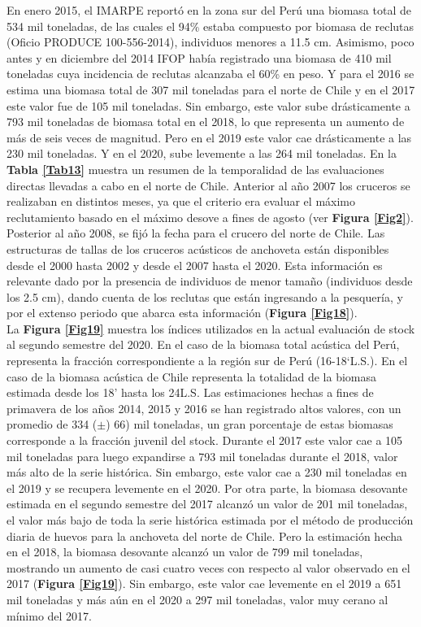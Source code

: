 \documentclass[letter,11pt]{article}
\begin{document}
En enero 2015, el IMARPE report\'o en la zona sur del Per\'u una biomasa
total de 534 mil toneladas, de las cuales el 94\% estaba compuesto por
biomasa de reclutas (Oficio PRODUCE 100-556-2014), individuos menores a
11.5 cm. Asimismo, poco antes y en diciembre del 2014 IFOP hab\'ia
registrado una biomasa de 410 mil toneladas cuya incidencia de reclutas
alcanzaba el 60\% en peso. Y para el 2016 se estima una biomasa total de
307 mil toneladas para el norte de Chile y en el 2017 este valor fue de
105 mil toneladas. Sin embargo, este valor sube dr\'asticamente a 793 mil
toneladas de biomasa total en el 2018, lo que representa un aumento de
m\'as de seis veces de magnitud. Pero en el 2019 este valor cae
dr\'asticamente a las 230 mil toneladas. Y en el 2020, sube levemente a
las 264 mil toneladas. En la \textbf{Tabla \ref{Tab13}} muestra un resumen de la temporalidad de
las evaluaciones directas llevadas a cabo en el norte de Chile. Anterior
al a\~{n}o 2007 los cruceros se realizaban en distintos meses, ya que el
criterio era evaluar el m\'aximo reclutamiento basado en el m\'aximo desove
a fines de agosto (ver \textbf{Figura \ref{Fig2}}). Posterior al a\~{n}o
2008, se fij\'o la fecha para el crucero del norte de Chile. Las
estructuras de tallas de los cruceros ac\'usticos de anchoveta est\'an
disponibles desde el 2000 hasta 2002 y desde el 2007 hasta el 2020. Esta
informaci\'on es relevante dado por la presencia de individuos de menor
tama\~{n}o (individuos desde los 2.5 cm), dando cuenta de los reclutas que
est\'an ingresando a la pesquer\'ia, y por el extenso periodo que abarca
esta informaci\'on (\textbf{Figura \ref{Fig18}}).\\

La \textbf{Figura \ref{Fig19}} muestra los \'indices utilizados en la
actual evaluaci\'on de stock al segundo semestre del 2020. En el caso de
la biomasa total ac\'ustica del Per\'u, representa la fracci\'on
correspondiente a la regi\'on sur de Per\'u (16-18`L.S.). En el
caso de la biomasa ac\'ustica de Chile representa la totalidad de la
biomasa estimada desde los 18' hasta los 24\degree L.S. Las
estimaciones hechas a fines de primavera de los a\~{n}os 2014, 2015 y 2016
se han registrado altos valores, con un promedio de 334 ($\pm$) 66) mil
toneladas, un gran porcentaje de estas biomasas corresponde a la
fracci\'on juvenil del stock. Durante el 2017 este valor cae a 105 mil
toneladas para luego expandirse a 793 mil toneladas durante el 2018,
valor m\'as alto de la serie hist\'orica. Sin embargo, este valor cae a 230
mil toneladas en el 2019 y se recupera levemente en el 2020. Por otra
parte, la biomasa desovante estimada en el segundo semestre del 2017
alcanz\'o un valor de 201 mil toneladas, el valor m\'as bajo de toda la
serie hist\'orica estimada por el m\'etodo de producci\'on diaria de huevos
para la anchoveta del norte de Chile. Pero la estimaci\'on hecha en el
2018, la biomasa desovante alcanz\'o un valor de 799 mil toneladas,
mostrando un aumento de casi cuatro veces con respecto al valor
observado en el 2017 (\textbf{Figura \ref{Fig19}}). Sin embargo, este
valor cae levemente en el 2019 a 651 mil toneladas y m\'as a\'un en el 2020
a 297 mil toneladas, valor muy cerano al m\'inimo del 2017.
\end{document}
